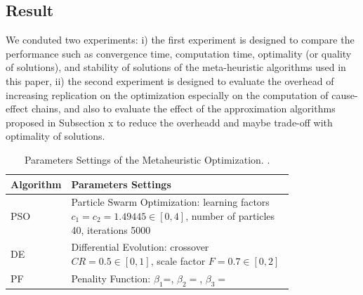 \subsection{Result}
We conduted two experiments: i) the first experiment is designed to compare the performance  such as convergence time, computation time, optimality (or quality of solutions), and stability of solutions of the meta-heuristic algorithms used in this paper, ii) the second experiment is designed to evaluate the overhead of increasing replication on the optimization especially on the computation of cause-effect chains, and also to evaluate the effect of the approximation algorithms proposed in Subsection x to reduce the overheadd and maybe trade-off with optimality of solutions.
\begin{table}
	\centering\small
	\begin{tabular}{@{}lp{0.8\linewidth}@{}}
		\toprule
		Algorithm & Parameters Settings\\ 
		\midrule
		PSO	& Particle Swarm Optimization: learning factors $c_1=c_2=1.49445\in [0,4]$,  number of particles 40, iterations 5000	\\
		DE	& Differential Evolution: crossover $CR=0.5\in[0,1]$, scale factor $F=0.7\in[0,2]$  \\
		PF& Penality Function:  $\beta_1$=,  $\beta_2=$, $ \beta_3=$\\
		\bottomrule
	\end{tabular}
	\caption{Parameters Settings of the Metaheuristic Optimization. .}
	\label{tbl_para}
\end{table}


